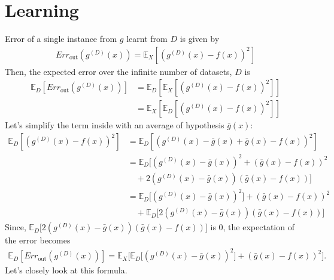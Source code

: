 \section{Learning}
Error of a single instance from $g$ learnt from $D$ is given by
\begin{align*}
	Err_{\textrm{out}}(g^{(D)}(x)) = \mathbb{E}_{X}[(g^{(D)}(x)-f(x))^2]
\end{align*}
Then, the expected error over the infinite number of datasets, $D$ is
\begin{align*}
	\mathbb{E}_D[Err_{\textrm{out}}(g^{(D)}(x))] &= \mathbb{E}_D[\mathbb{E}_{X}[(g^{(D)}(x)-f(x))^2]]\\
												 &= \mathbb{E}_X[\mathbb{E}_D[(g^{(D)}(x)-f(x))^2]]
\end{align*}
Let's simplify the term inside with an average of hypothesis $\bar{g}(x)$:
\begin{align*}
	\mathbb{E}_D[(g^{(D)}(x)-f(x))^2]&= \mathbb{E}_D[(g^{(D)}(x)-\bar{g}(x)+\bar{g}(x)-f(x))^2]\\
	&= \mathbb{E}_D\big[(g^{(D)}(x)-\bar{g}(x))^2+(\bar{g}(x)-f(x))^2\\ &\quad + 2 (g^{(D)}(x)-\bar{g}(x))(\bar{g}(x)-f(x))\big]\\
	&= \mathbb{E}_D\big[(g^{(D)}(x)-\bar{g}(x))^2\big]+(\bar{g}(x)-f(x))^2\\ &\quad + \mathbb{E}_D\big[2 (g^{(D)}(x)-\bar{g}(x))(\bar{g}(x)-f(x))\big]
\end{align*}
Since, $\mathbb{E}_D\big[2 (g^{(D)}(x)-\bar{g}(x))(\bar{g}(x)-f(x))\big]$ is 0, the expectation of the error becomes
\begin{align*}
	\mathbb{E}_D[Err_{\textrm{out}}(g^{(D)}(x))] = \mathbb{E}_X\big[\mathbb{E}_D\big[(g^{(D)}(x)-\bar{g}(x))^2\big]+(\bar{g}(x)-f(x))^2\big].
\end{align*}
Let's closely look at this formula.
